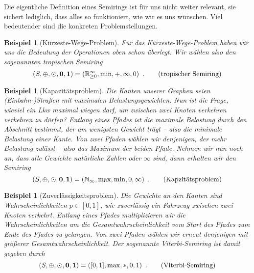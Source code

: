 \documentclass[ngerman, a4paper, 12pt]{article}
\newcommand{\satzende}{\enskip \text{.}}
\theoremstyle{mystyle}
\newtheorem{beispiel}[definition]{Beispiel}
\begin{document}
	Die eigentliche Definition eines Semirings ist für uns nicht weiter relevant, sie sichert lediglich, dass alles so funktioniert, wie wir es uns wünschen. Viel bedeutender sind die konkreten Problemstellungen.
	
	\begin{beispiel}[Kürzeste-Wege-Problem]
		\label{bsp: kuerzeste-wege-problem}
		Für das Kürzeste-Wege-Problem haben wir uns die Bedeutung der Operationen oben schon überlegt. Wir wählen also den sogenannten tropischen Semiring
		\begin{equation}
			(S, \oplus, \odot, \mathbf{0}, \mathbf{1}) = (\R_{\ge 0}^\infty, \min, +, \infty, 0) \satzende
			\tag{tropischer Semiring}
		\end{equation}
	\end{beispiel}
	
	\begin{beispiel}[Kapazitätsproblem] 
		\label{bsp: kapazitaetsproblem}
		Die Kanten unserer Graphen seien (Einbahn-)Straßen mit maximalen Belastungsgewichten. Nun ist die Frage, wieviel ein Lkw maximal wiegen darf, um zwischen zwei Knoten verkehren verkehren zu dürfen?
		Entlang eines Pfades ist die maximale Belastung durch den Abschnitt bestimmt, der am wenigsten Gewicht trägt -- also die \textit{minimale} Belastung einer Kante. Von zwei Pfaden wählen wir denjenigen, der mehr Belastung zulässt -- also das  \textit{Maximum} der beiden Pfade.
		Nehmen wir nun noch an, dass alle Gewichte natürliche Zahlen oder $\infty$ sind, dann erhalten wir den Semiring
		\begin{equation}
			(S, \oplus, \odot, \mathbf{0}, \mathbf{1}) = (\N_\infty, \max, \min, 0, \infty) \satzende
			\tag{Kapzitätsproblem}
		\end{equation}
	\end{beispiel}

	\begin{beispiel}[Zuverlässigkeitsproblem] 
		\label{bsp: zuverlaessigkeitsproblem}
		Die Gewichte an den Kanten sind Wahrscheinlichkeiten $p \in [0,1]$, wie zuverlässig ein Fahrzeug zwischen zwei Knoten verkehrt. Entlang eines Pfades multiplizieren wir die Wahrscheinlichkeiten um die Gesamtwahrscheinlichkeit vom Start des Pfades zum Ende des Pfades zu gelangen. Von zwei Pfaden wählen wir erneut denjenigen mit größerer Gesamtwahrscheinlichkeit. Der sogenannte Viterbi-Semiring ist damit gegeben durch
		\begin{equation}
			(S, \oplus, \odot, \mathbf{0}, \mathbf{1}) = ([0,1], \max, *, 0, 1) \satzende
			\tag{Viterbi-Semiring}
		\end{equation}
	\end{beispiel}
\end{document}
